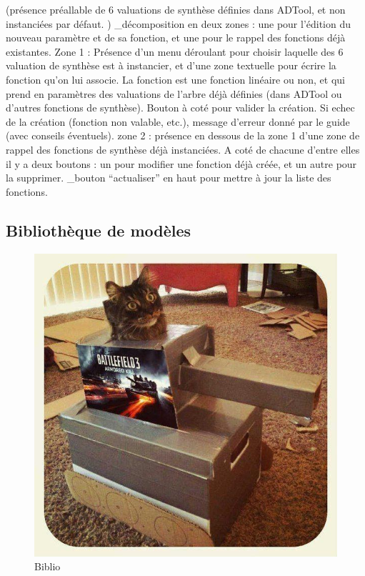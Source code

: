 		(présence préallable de 6 valuations de synthèse définies dans ADTool, et non instanciées par défaut. )
		_décomposition en deux zones : une pour l'édition du nouveau paramètre et de sa fonction, et une pour le rappel des fonctions déjà existantes.
		Zone 1 : Présence d’un menu déroulant pour choisir laquelle des 6 valuation de synthèse est à instancier, et d'une zone textuelle pour écrire la fonction qu'on lui associe. La fonction est une fonction linéaire ou non, et qui prend en paramètres des valuations de l'arbre déjà définies (dans ADTool ou d'autres fonctions de synthèse). Bouton à coté pour valider la création. Si echec de la création (fonction non valable, etc.), message d'erreur donné par le guide (avec conseils éventuels).
		zone 2 : présence en dessous de la zone 1 d’une zone de rappel des fonctions de synthèse déjà instanciées. A coté de chacune d’entre elles il y a deux boutons : un pour modifier une fonction déjà créée, et un autre pour la supprimer.
		_bouton “actualiser” en haut pour mettre à jour la liste des fonctions.


	\subsection{Bibliothèque de modèles}
		\begin{figure}
			\begin{center}
				\includegraphics[width=1\textwidth]{figure/biblio.jpg}
			\end{center}
			\caption{Biblio}
			\label{fig:biblio}
		\end{figure}

